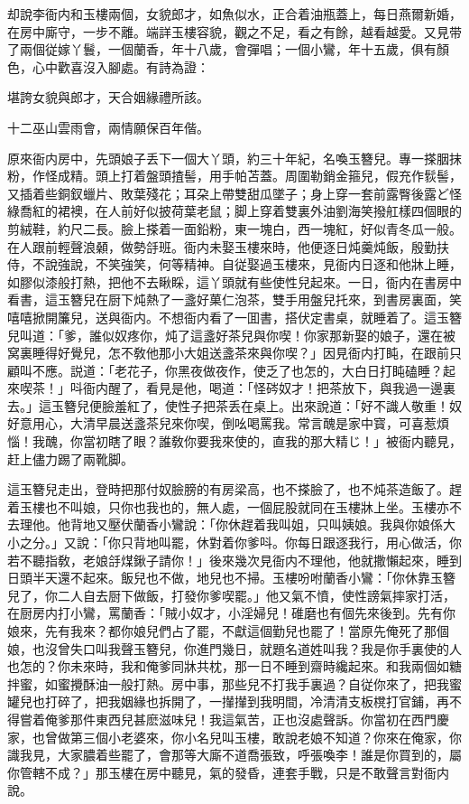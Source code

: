 却說李衙内和玉樓兩個，女貌郎才，如魚似水，正合着油瓶蓋上，每日燕爾新婚，在房中廝守，一步不離。端詳玉樓容貌，觀之不足，看之有餘，越看越愛。又見带了兩個従嫁丫鬟，一個蘭香，年十八歲，會彈唱；一個小鸞，年十五歲，俱有顏色，心中歡喜沒入腳處。有詩為證：

堪誇女貌與郎才，天合姻緣禮所該。

十二巫山雲雨會，兩情願保百年偕。

原來衙内房中，先頭娘子丢下一個大丫頭，約三十年紀，名喚玉簪兒。專一搽胭抹粉，作怪成精。頭上打着盤頭揸髻，用手帕苫蓋。周圍勒銷金箍兒，假充作䯼髻，又插着些銅釵蠟片、敗葉殘花；耳朶上帶雙甜瓜墜子；身上穿一套前露臀後露ど怪綠喬紅的裙襖，在人前好似披荷葉老鼠；脚上穿着雙裏外油劉海笑撥舡樣四個眼的剪絨鞋，約尺二長。臉上搽着一面鉛粉，東一塊白，西一塊紅，好似青冬瓜一般。在人跟前輕聲浪顙，做勢㧱班。衙内未娶玉樓來時，他便逐日炖羹炖飯，殷勤扶侍，不說強說，不笑強笑，何等精神。自従娶過玉樓來，見衙内日逐和他牀上睡，如膠似漆般打熱，把他不去瞅睬，這丫頭就有些使性兒起來。一日，衙内在書房中看書，這玉簪兒在厨下炖熱了一盞好菓仁泡茶，雙手用盤兒托來，到書房裏面，笑嘻嘻掀開簾兒，送與衙内。不想衙内看了一囬書，搭伏定書桌，就睡着了。這玉簪兒叫道：「爹，誰似奴疼你，炖了這盞好茶兒與你喫！你家那新娶的娘子，還在被窝裏睡得好覺兒，怎不敎他那小大姐送盞茶來與你喫？」因見衙内打盹，在跟前只顧叫不應。説道：「老花子，你黑夜做夜作，使乏了也怎的，大白日打盹磕睡？起來喫茶！」呌衙内醒了，看見是他，喝道：「怪硶奴才！把茶放下，與我過一邊裏去。」這玉簪兒便臉羞紅了，使性子把茶丢在桌上。出來說道：「好不識人敬重！奴好意用心，大清早晨送盞茶兒來你喫，倒吆喝罵我。常言醜是家中寳，可喜惹煩惱！我醜，你當初瞎了眼？誰敎你要我來使的，直我的那大精じ！」被衙内聽見，赶上儘力踢了兩靴脚。

這玉簪兒走出，登時把那付奴臉膀的有房梁高，也不搽臉了，也不炖茶造飯了。趕着玉樓也不叫娘，只你也我也的，無人處，一個屁股就同在玉樓牀上坐。玉樓亦不去理他。他背地又壓伏蘭香小鸞說：「你休趕着我叫姐，只叫姨娘。我與你娘係大小之分。」又說：「你只背地叫罷，休對着你爹呌。你每日跟逐我行，用心做活，你若不聽指敎，老娘㧱煤鍬子請你！」後來幾次見衙内不理他，他就撒懶起來，睡到日頭半天還不起來。飯兒也不做，地兒也不掃。玉樓吩咐蘭香小鸞：「你休靠玉簪兒了，你二人自去厨下做飯，打發你爹喫罷。」他又氣不憤，使性謗氣摔家打活，在厨房内打小鸞，罵蘭香：「賊小奴才，小淫婦兒！碓磨也有個先來後到。先有你娘來，先有我來？都你娘兒們占了罷，不獻這個勤兒也罷了！當原先俺死了那個娘，也沒曾失口叫我聲玉簪兒，你進門幾日，就題名道姓叫我？我是你手裏使的人也怎的？你未來時，我和俺爹同牀共枕，那一日不睡到齋時纔起來。和我兩個如糖拌蜜，如蜜攪酥油一般打熱。房中事，那些兒不打我手裏過？自従你來了，把我蜜罐兒也打碎了，把我姻緣也拆開了，一攆攆到我明間，冷清清支板櫈打官鋪，再不得嘗着俺爹那件東西兒甚麽滋味兒！我這氣苦，正也沒處聲訴。你當初在西門慶家，也曾做第三個小老婆來，你小名兒叫玉樓，敢說老娘不知道？你來在俺家，你識我見，大家膿着些罷了，會那等大廝不道喬張致，呼張喚李！誰是你買到的，屬你管轄不成？」那玉樓在房中聽見，氣的發昏，連套手戰，只是不敢聲言對衙内說。

